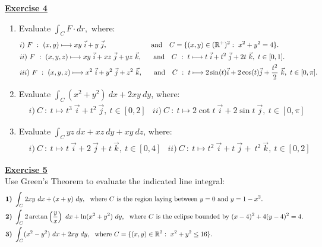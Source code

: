 \noindent\Large{\underline{\textbf{Exercise 4}}}
\normalsize{}
\begin{enumerate}
\item Evaluate $\displaystyle \int_C F\cdot dr,$ where:
\begin{align*}
    &i)  \ F\ :\ (x,y) \longmapsto xy\ \vec{i} + y\ \vec{j},\qquad \qquad \qquad 
                            \text{ and }\ \ C = \{(x,y)\in(\R^+)^2:\ x^2 + y^2 = 4\}.\\ 
    &ii) \ F\ :\ (x,y,z) \longmapsto xy\ \vec{i} + xz\ \vec{j} + yz\ \vec{k},\quad\ \text{ and }\ \ C\ :\ t \longmapsto
                            t\ \vec{i} + t^2\ \vec{j} + 2t\ \vec{k},\ t\in[0,1].\\
    &iii)\ F\ :\ (x,y,z) \longmapsto x^2\ \vec{i} + y^2\ \vec{j} + z^2\ \vec{k},\quad\ \text{ and }\ \ C\ :\ t \longmapsto
                            2\sin (t)\vec{i} + 2\cos (t)\vec{j} + \frac{t^2}{2}\ \vec{k},\ t\in[0,\pi].
\end{align*}
\item Evaluate $\displaystyle \int_C(x^2 + y^2)\ dx + 2xy\ dy$, where:
\begin{align*}
    & i)  \ C\ :\ t \longmapsto t^3\ \vec{i} + t^2\ \vec{j},\ t\in[0,2]
    & ii) \ C\ :\ t \longmapsto 2\cot t\ \vec{i} + 2\sin t\ \vec{j},\ t\in\left[0,\pi\right]
\end{align*}
\item Evaluate $\displaystyle \int_C yz\ dx + xz\ dy + xy\ dz$, where:
\begin{align*}
    & i)  \ C\ :\ t \longmapsto t\ \vec{i} + 2\ \vec{j} + t\ \vec{k},\ t\in[0,4]
    & ii) \ C\ :\ t \longmapsto t^2\ \vec{i} + t\ \vec{j} + \ t^2\ \vec{k},\ t\in[0,2]
\end{align*}
\end{enumerate}
\newpage
\noindent\Large{\underline{\textbf{Exercise 5}}}
\normalsize{}\\
\noindent Use Green’s Theorem to evaluate the indicated line integral:
\begin{align*}
    &\textbf{1)}\ \int_C 2xy\ dx + (x + y)\ dy,\ 
              \text{ where $C$ is the region laying between $y = 0$ and $y = 1 - x^2$.}\\
    &\textbf{2)}\ \int_C 2\arctan\left(\dfrac{y}{x}\right)\ dx + \ln(x^2 + y^2)\ dy,\ 
              \text{ where $C$ is the eclipse bounded by $(x - 4)^2 + 4(y - 4)^2 = 4$.}\\
    &\textbf{3)}\ \int_C (x^2 - y^2)\ dx + 2xy\ dy,\ 
              \text{ where $C = \{(x,y)\in\R^2:\ x^2 + y^2 \leq 16\}$.}
\end{align*}

